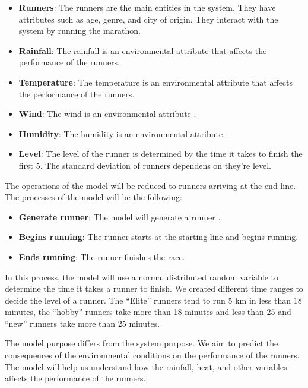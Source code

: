 \documentclass[conference]{IEEEtran}
\begin{document}
\begin{itemize}
    \item \textbf{Runners}: The runners are the main entities in the system. They have attributes such as age, genre, and city of origin. They interact with the system by running the marathon.
    \item \textbf{Rainfall}: The rainfall is an environmental attribute that affects the performance of the runners.
    \item \textbf{Temperature}: The temperature is an environmental attribute that affects the performance of the runners.
    \item \textbf{Wind}: The wind is an environmental attribute .
    \item \textbf{Humidity}: The humidity is an environmental attribute.
    \item \textbf{Level}: The level of the runner is determined by the time it takes to finish the first 5. The standard deviation of runners dependens on they're level. 
\end{itemize}

The operations of the model will be reduced to runners arriving at the end line. The processes of the model will be the following:
\begin{itemize}
    \item \textbf{Generate runner}: The model will generate a runner .
    \item \textbf{Begins running}: The runner starts at the starting line and begins running.
    \item \textbf{Ends running}: The runner finishes the race.
\end{itemize}

In this process, the model will use a normal distributed random variable to determine the time it takes a runner to finish. We created different time ranges to decide the level of a runner. The ``Elite'' runners tend to run 5 km in less than 18 minutes, the ``hobby'' runners take more than 18 minutes and less than 25 and ``new'' runners take more than 25 minutes.

The model purpose differs from the system purpose. We aim to predict the consequences of the environmental conditions on the performance of the runners. The model will help us understand how the rainfall, heat, and other variables affects the performance of the runners.
\end{document}
